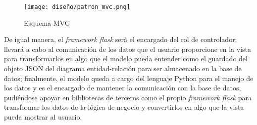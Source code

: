 \begin{figure}[H]
  \centering
  \texttt{[image: diseño/patron\_mvc.png]}
  \caption{Esquema MVC}
  \label{img:mvc_implementation}
\end{figure}


De igual manera, el \textit{framework flask} será el encargado del rol de controlador; llevará a cabo al comunicación de los datos que el usuario proporcione en la vista para transformarlos en algo que el modelo pueda entender como el guardado del objeto JSON del diagrama entidad-relación para ser almacenado en la base de datos; finalmente, el modelo queda a cargo del lenguaje Python para el manejo de los datos y es el encargado de mantener la comunicación con la base de datos, pudiéndose apoyar en bibliotecas de terceros como el propio \textit{framework flask} para transformar los datos de la lógica de negocio y convertirlos en algo que la vista pueda mostrar al usuario.
